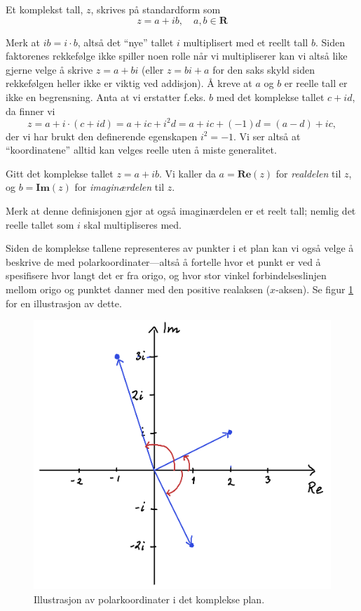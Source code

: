\documentclass[a4paper,norsk,12pt]{article}
\begin{document}
\begin{tdef}
Et komplekst tall, $z$, skrives på standardform som
\begin{displaymath}
	z = a + ib, \quad a,b\in\mathbf{R}
\end{displaymath}
\end{tdef}
\noindent
Merk at $ib = i\cdot b$, altså det ``nye'' tallet $i$ multiplisert med et reellt tall $b$. Siden faktorenes rekkefølge ikke spiller noen rolle når vi multipliserer kan vi altså like gjerne velge å skrive $z=a+bi$ (eller $z= bi + a$ for den saks skyld siden rekkefølgen heller ikke er viktig ved addisjon). Å kreve at $a$ og $b$ er reelle tall er ikke en begrensning. Anta at vi erstatter f.eks. $b$ med det komplekse tallet $c+id$, da finner vi
\begin{displaymath}
	z = a + i\cdot(c+id) = a+ ic + i^2d = a + ic +(-1)d = (a-d)+ic,
\end{displaymath}
der vi har brukt den definerende egenskapen $i^2=-1$. Vi ser altså at ``koordinatene'' alltid kan velges reelle uten å miste generalitet. 
\begin{tdef}
	Gitt det komplekse tallet $z = a+ib$. Vi kaller da $a = \mathbf{Re}(z)$ for \emph{realdelen} til $z$, og $b=\mathbf{Im}(z)$ for \emph{imaginærdelen} til $z$.
\end{tdef}
\noindent
Merk at denne definisjonen gjør at også imaginærdelen er et reelt tall; nemlig det reelle tallet som $i$ skal multipliseres med.

Siden de komplekse tallene representeres av punkter i et plan kan vi også velge å beskrive de med polarkoordinater---altså å fortelle hvor et punkt er ved å spesifisere hvor langt det er fra origo, og hvor stor vinkel forbindelseslinjen mellom origo og punktet danner med den positive realaksen ($x$-aksen). Se figur \ref{kompleks:fig:polar} for en illustrasjon av dette. 

\begin{figure}[htp]
	\begin{center}
	\includegraphics[width=.5\textwidth]{./polarform}
	\end{center}
	\caption{Illustrasjon av polarkoordinater i det komplekse plan.}
	\label{kompleks:fig:polar}
\end{figure}
\end{document}
